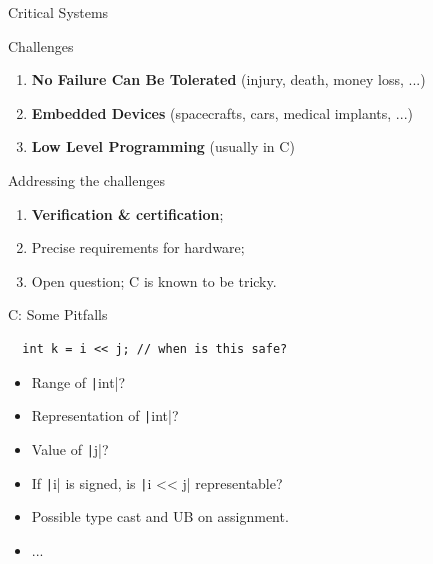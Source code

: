 \documentclass[xcolor={usenames,dvipsnames}]{beamer}
\newcommand{\InlineC}[1]{\texttt|#1|}
\begin{document}
\begin{frame}{Critical Systems}

  \begin{block}{Challenges}

    \begin{enumerate}
      \item \textbf{No Failure Can Be Tolerated} (injury, death, money loss, ...)
      \item \textbf{Embedded Devices} (spacecrafts, cars, medical implants, ...)
      \item \textbf{Low Level Programming} (usually in C)
    \end{enumerate}

  \end{block}

  \pause \vfill

  \begin{block}{Addressing the challenges}

    \begin{enumerate}
      \item \textbf{Verification \& certification};
      \item Precise requirements for hardware;
      \item Open question; C is known to be tricky.
    \end{enumerate}

  \end{block}

\end{frame}


\begin{frame}[fragile]{C: Some Pitfalls}

  \begin{verbatim}
  int k = i << j; // when is this safe?
  \end{verbatim}

  \pause

  \begin{itemize}
    \item Range of \InlineC{int}?
    \item Representation of \InlineC{int}?
    \item Value of \InlineC{j}?
    \item If \InlineC{i} is signed, is \InlineC{i << j} representable?
    \item Possible type cast and UB on assignment.
    \item ...
  \end{itemize}

\end{frame}
\end{document}
